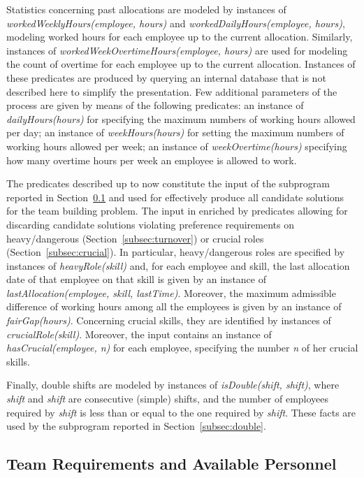 \documentclass{tlp}
\begin{document}
Statistics concerning past allocations are modeled by instances of
\textit{workedWeeklyHours(employee, hours)} and \textit{workedDailyHours(employee, hours)},
modeling worked hours for each employee up to the current allocation.
Similarly, instances of \textit{workedWeekOvertimeHours(employee, hours)} are used for modeling the count of overtime
for each employee up to the current allocation.
Instances of these predicates are produced
by querying an internal database that is not described here
to simplify the presentation.
Few additional parameters of the process are given by means of the following predicates:
an instance of \textit{dailyHours(hours)} for specifying the maximum numbers of working hours allowed per day;
an instance of \textit{weekHours(hours)} for setting the maximum numbers of working hours allowed per week;
an instance of \textit{weekOvertime(hours)} specifying how many overtime hours per week an employee is allowed to work.

The predicates described up to now constitute the input of the subprogram reported in Section~\ref{subsec:teamRec} and used for effectively produce all candidate solutions for the team building problem.
The input in enriched by predicates allowing for discarding candidate solutions violating preference requirements on heavy/dangerous (Section~\ref{subsec:turnover}) or crucial roles (Section~\ref{subsec:crucial}).
In particular, heavy/dangerous roles are specified by instances of \textit{heavyRole(skill)} and, for each employee and skill, the last allocation date of that employee on that skill is given by an instance of \textit{lastAllocation(employee, skill, lastTime)}.
Moreover, the maximum admissible difference of working hours among all the employees
is given by an instance of \textit{fairGap(hours)}.
Concerning crucial skills, they are identified by instances of \textit{crucialRole(skill)}.
Moreover, the input contains an instance of \textit{hasCrucial(employee, n)} for each employee, specifying the number \textit{n} of her crucial skills.

Finally, double shifts are modeled by instances of \textit{isDouble(shift, shift)},
where \textit{shift} and \textit{shift} are consecutive (simple) shifts,
and the number of employees required by \textit{shift} is less than or equal to the one
required by \textit{shift}.
These facts are used by the subprogram reported in Section~\ref{subsec:double}.


\subsection{Team Requirements and Available Personnel}\label{subsec:teamRec}
\end{document}
